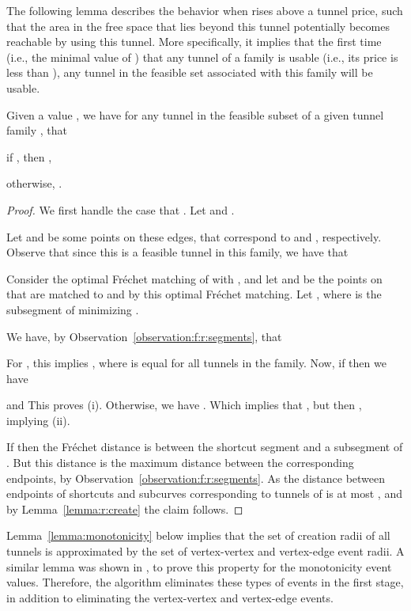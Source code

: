 \documentclass[12pt]{article}
\newcommand{\lemlab}[1]{\label{lemma:#1}}
\newcommand{\lemref}[1]{Lemma~\ref{lemma:#1}}
\newcommand{\obsref}[1]{Observation~\ref{observation:#1}}
\newcommand{\Frechet}{Fr\'{e}c{h}e{}t\xspace}\providecommand{\Arr}{\mathop{\mathrm{\EuScript{A}}}}
\newcommand{\tunnel}{tunnel\xspace}
\newcommand{\tunnels}{tunnels\xspace}
\numberwithin{figure}{section}
\numberwithin{equation}{section}
\begin{document}
The following lemma describes the behavior when  rises above a
\tunnel price, such that the area in the free space that lies beyond
this \tunnel potentially becomes reachable by using this \tunnel. More
specifically, it implies that the first time (i.e., the minimal value
of ) that any \tunnel of a family
 is usable (i.e., its price is less
than ), any \tunnel in the feasible set
 associated with this
family will be usable.
\begin{lemma}\lemlab{tunnel:event}Given a value , we have for any \tunnel
     in the feasible subset of a given \tunnel
    family , that
    \begin{compactenum}[(i)]
        \item if , then
        ,
        
        \item otherwise, .
    \end{compactenum}
\end{lemma}
\begin{proof}
    We first handle the case that .  Let  and .
    
    
    
    Let  and  be some points on
    these edges, that correspond to  and , respectively.
    Observe that since this is a feasible \tunnel in this family, we
    have that
    
    Consider the optimal \Frechet matching of 
    with , and let  and  be the points on 
    that are matched to  and  by this optimal
    \Frechet matching.  Let , where
     is the subsegment of  minimizing .
    
    We have, by \obsref{f:r:segments}, that
    

    For , this implies , where  is equal for all \tunnels in the
    family.  Now, if   then we have
    
    and
    This proves (i).  Otherwise, we have
    . Which
    implies that , but then , implying (ii).
    
    If  then the \Frechet distance is between the shortcut
    segment and a subsegment of . But this distance is the
    maximum distance between the corresponding endpoints, by
    \obsref{f:r:segments}. As the distance between endpoints of
    shortcuts and subcurves corresponding to \tunnels of
     is at most
    , and by \lemref{r:create} the claim follows.
\end{proof}




\lemref{monotonicity} below implies that the set of creation radii of
all \tunnels is approximated by the set of vertex-vertex and
vertex-edge event radii.  A similar lemma was shown in
\cite{dhw-afdrc-12}, to prove this property for the monotonicity event
values. Therefore, the algorithm eliminates these types of events in
the first stage, in addition to eliminating the vertex-vertex and
vertex-edge events.
\end{document}
